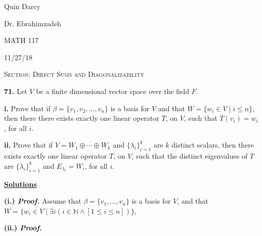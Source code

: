 \documentclass[12pt, a4paper]{article}
\begin{document}
\begin{flushleft}
  
    Quin Darcy\par
    Dr. Ebrahimzadeh\par
    MATH 117\par
    11/27/18
  
\end{flushleft}
  
\centerline{}
 
\vspace{4mm}
 
\noindent\textsc{Section: Direct Sums and Diagonalizability}\par
 
\justifying
 
\vspace{1mm}
 
\hline
 
\vspace{4mm}

\noindent\textbf{71.} Let $V$ be a finite dimensional vector space over the field $F$.

\begin{description}
    \item \textbf{ i.} Prove that if $\beta=\{v_1,v_2,\dots,v_n\}$ is a basis for $V$ and that $W=\{w_i\in V\mid i\leq n\}$, then there there exists exactly one linear operator $T$, on $V$, such that $T(v_i)=w_i$, for all $i$.
    \item\textbf{ii.} Prove that if $V=W_1\oplus\cdots\oplus W_k$ and $\{\lambda_i\}_{i=1}^{k}$ are $k$ distinct scalars, then there exists exactly one linear operator $T$, on $V$, such that the distinct eigenvalues of $T$ are $\{\lambda_i\}_{i=1}^{k}$ and $E_{\lambda_i}=W_i$, for all $i$.
\end{description}

\vspace{6mm}

\noindent\textbf{\underline{Solutions}}

\vspace{4mm}

\textbf{(i.) \textit{Proof.}} Assume that $\beta=\{v_1,\dots,v_n\}$ is a basis for $V$, and that \\ $W=\{w_i\in V\mid\exists i(i\in\mathbb{N}\wedge[1\leq i\leq n])\}$,

\vspace{4mm}

\textbf{(ii.) \textit{Proof.}} 

\newpage
\end{document}
